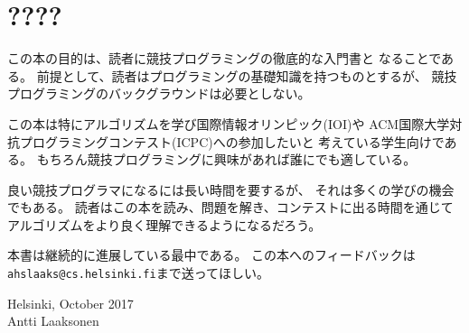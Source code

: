 \begin{comment}
\chapter*{Preface}
\markboth{\MakeUppercase{Preface}}{}
\addcontentsline{toc}{chapter}{Preface}
\end{comment}
\chapter*{????}

\begin{comment}
The purpose of this book is to give you
a thorough introduction to competitive programming.
It is assumed that you already
know the basics of programming, but no previous
background in competitive programming is needed.
\end{comment}

この本の目的は、読者に競技プログラミングの徹底的な入門書と
なることである。
前提として、読者はプログラミングの基礎知識を持つものとするが、
競技プログラミングのバックグラウンドは必要としない。

\begin{comment}
The book is especially intended for
students who want to learn algorithms and
possibly participate in
the International Olympiad in Informatics (IOI) or
in the International Collegiate Programming Contest (ICPC).
Of course, the book is also suitable for 
anybody else interested in competitive programming.
\end{comment}

この本は特にアルゴリズムを学び国際情報オリンピック(IOI)や
ACM国際大学対抗プログラミングコンテスト(ICPC)への参加したいと
考えている学生向けである。
もちろん競技プログラミングに興味があれば誰にでも適している。

\begin{comment}
It takes a long time to become a good competitive
programmer, but it is also an opportunity to learn a lot.
You can be sure that you will get
a good general understanding of algorithms
if you spend time reading the book,
solving problems and taking part in contests.
\end{comment}

良い競技プログラマになるには長い時間を要するが、
それは多くの学びの機会でもある。
読者はこの本を読み、問題を解き、コンテストに出る時間を通じて
アルゴリズムをより良く理解できるようになるだろう。

\begin{comment}
The book is under continuous development.
You can always send feedback on the book to
\texttt{ahslaaks@cs.helsinki.fi}.
\end{comment}

本書は継続的に進展している最中である。
この本へのフィードバックは\texttt{ahslaaks@cs.helsinki.fi}まで送ってほしい。


\begin{flushright}
Helsinki, October 2017 \\
Antti Laaksonen
\end{flushright}
